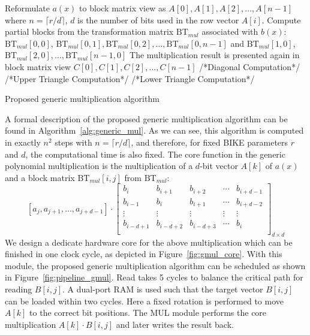 \documentclass[runningheads]{llncs}
\begin{document}
\begin{algorithm}[!tbh]
 \DontPrintSemicolon %
    Reformulate $a(x)$ to block matrix view as $A[0],A[1],A[2],\ldots, A[n-1]$ where $n=\lceil r/d \rceil$, $d$ is the number of bits used in the row vector $A[i]$.\;
    Compute partial blocks from the transformation matrix $\text{BT}_{mul}$ associated with $b(x)$: $\text{BT}_{mul}[0,0]$, $\text{BT}_{mul}[0,1],\text{BT}_{mul}[0,2],\ldots,\text{BT}_{mul}[0,n-1]$ and $\text{BT}_{mul}[1,0]$, $\text{BT}_{mul}[2,0],\ldots,\text{BT}_{mul}[n-1,0]$\;
    The multiplication result is presented again in block matrix view $C[0],C[1],C[2],\ldots, C[n-1]$\;
    /*Diagonal Computation*/\;
    /*Upper Triangle Computation*/\;
    /*Lower Triangle Computation*/\;
 \caption{Proposed generic multiplication algorithm}\label{alg:generic_mul}
\end{algorithm}

A formal description of the proposed generic multiplication algorithm
can be found in Algorithm~\ref{alg:generic_mul}.
As we can see, this algorithm is computed in exactly $n^2$ steps with $n=\lceil r/d\rceil$, and therefore, for fixed BIKE parameters $r$ and $d$, the computational time is also fixed.
The core function in the generic polynomial multiplication
is the multiplication of a $d$-bit vector $A[k]$ of $a(x)$ and a block matrix $\text{BT}_{mul}$$[i,j]$ from $\text{BT}_{mul}$:
\[
    [a_j,a_{j+1},\ldots,a_{j+d-1}]\cdot
\left[ \begin{array}{ccccc}
b_{i}&b_{i+1}&b_{i+2}&\cdots &b_{i+d-1} \\
b_{i-1}&b_{i}&b_{i+1}&\cdots &b_{i+d-2} \\
\vdots&\vdots&\vdots&\vdots&\vdots\\
b_{i-d+1}&b_{i-d+2}&b_{i-d+3}&\cdots &b_{i} \\
\end{array}
\right ]_{d\times d}
\]
We design a dedicate hardware core for the above multiplication which can be
finished in one clock cycle, as depicted in Figure~\ref{fig:gmul_core}.
With this module, the proposed generic multiplication algorithm
can be scheduled as shown in Figure~\ref{fig:pipeline_gmul}.
Read takes 5 cycles to balance the critical path for reading $B[i,j]$.
A dual-port RAM is used such that the target vector $B[i,j]$ can be loaded within two cycles. Here a fixed rotation is performed to move $A[k]$ to the correct bit positions.
The MUL module performs the core multiplication $A[k]\cdot B[i,j]$ and later writes
the result back.
\end{document}
